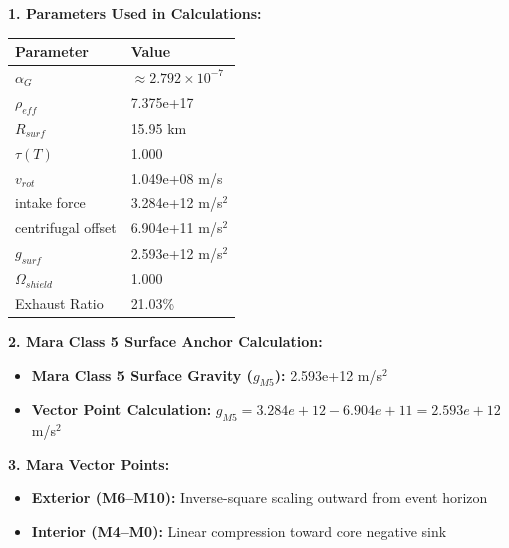 \documentclass[11pt, a4paper]{article}
\begin{document}
\vspace{0.5em}
\noindent \textbf{1. Parameters Used in Calculations:}
\begin{center}
  \begin{tabular}{|l|l|}
    \hline
    \textbf{Parameter} & \textbf{Value} \\ \hline
    $\alpha_G$ & $\approx 2.792 \times 10^{-7}$ \\ \hline
    $\rho_{eff}$ & 7.375e+17 \\ \hline
    $R_{surf}$ & 15.95 km \\ \hline
    $\tau(T)$ & 1.000 \\ \hline
    $v_{rot}$ & 1.049e+08 m/s \\ \hline
    intake force & 3.284e+12 m/s$^2$ \\ \hline
    centrifugal offset & 6.904e+11 m/s$^2$ \\ \hline
    $g_{surf}$ & 2.593e+12 m/s$^2$ \\ \hline
    $\Omega_{shield}$ & 1.000 \\ \hline
    Exhaust Ratio & 21.03\% \\ \hline
  \end{tabular}
\end{center}

\vspace{0.5em}
\noindent \textbf{2. Mara Class 5 Surface Anchor Calculation:}
\begin{itemize}
  \item \textbf{Mara Class 5 Surface Gravity ($g_{M5}$):} 2.593e+12 m/s$^2$
  \item \textbf{Vector Point Calculation:} $g_{M5} = 3.284e+12 - 6.904e+11 = 2.593e+12$ m/s$^2$
\end{itemize}

\vspace{0.5em}
\noindent \textbf{3. Mara Vector Points:}
\begin{itemize}
  \item \textbf{Exterior (M6--M10):} Inverse-square scaling outward from event horizon
  \item \textbf{Interior (M4--M0):} Linear compression toward core negative sink
\end{itemize}
\end{document}
